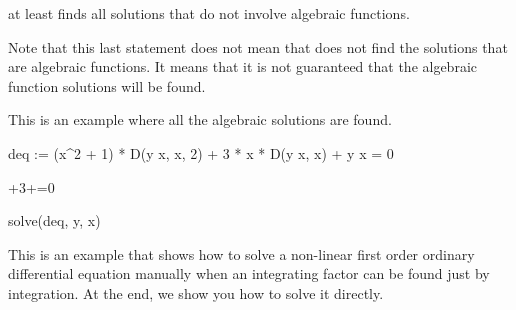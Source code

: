 {{{{{{{{{{{{{{{{\begin{items}
\Language{} at least finds all solutions that do not involve algebraic
functions.
\end{items}
%
Note that this last statement does not mean that \Language{} does not find
the solutions that are algebraic functions.
It means that it is not
guaranteed that the algebraic function solutions will be found.
%
\begin{xtc}
\begin{xtccomment}
This is an example where all the algebraic solutions are found.
\end{xtccomment}
\begin{spadsrc}
deq := (x^2 + 1) * D(y x, x, 2) + 3 * x * D(y x, x) + y x = 0 
\end{spadsrc}
\begin{TeXOutput}
\begin{fricasmath}{10}
\TIMES {}+3\TIMES {}\TIMES {}+=0%
\end{fricasmath}
\end{TeXOutput}
\end{xtc}
\begin{xtc}
\begin{xtccomment}
\end{xtccomment}
\begin{spadsrc}
solve(deq, y, x) 
\end{spadsrc}
\begin{TeXOutput}
\begin{fricasmath}{11}
%
\end{fricasmath}
\end{TeXOutput}
\end{xtc}


This is an example that shows how to solve a non-linear
first order ordinary differential equation manually when an integrating
factor can be found just by integration.
At the end, we show you how to solve it directly.

}}}}}}}}}}}}}}}}
